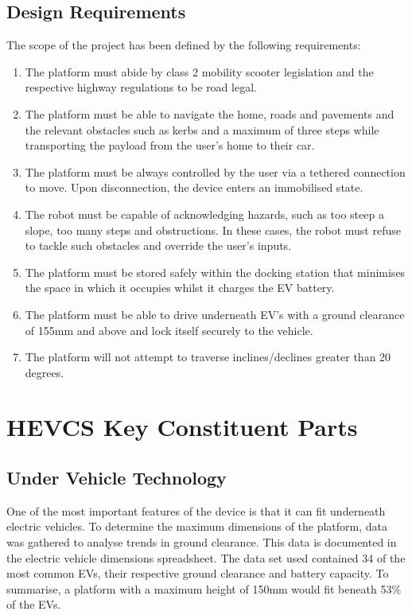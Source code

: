 \documentclass [12pt]{article}
\begin{document}
\subsection{Design Requirements}\label{sec:design_requirements}

The scope of the project has been defined by the following requirements:
\begin{enumerate}
    \item The platform must abide by class 2 mobility scooter legislation and the respective highway regulations to be road legal.
    \item The platform must be able to navigate the home, roads and pavements and the relevant obstacles such as kerbs and a maximum of three steps while transporting the payload from the user's home to their car.
    \item The platform must be always controlled by the user via a tethered connection to move. Upon disconnection, the device enters an immobilised state.
    \item The robot must be capable of acknowledging hazards, such as too steep a slope, too many steps and obstructions. In these cases, the robot must refuse to tackle such obstacles and override the user's inputs.
    \item The platform must be stored safely within the docking station that minimises the space in which it occupies whilst it charges the EV battery.
    \item The platform must be able to drive underneath EV's with a ground clearance of 155mm and above and lock itself securely to the vehicle.
    \item The platform will not attempt to traverse inclines/declines greater than 20 degrees.
  \end{enumerate}


\section{HEVCS Key Constituent Parts}\label{sec:constituent_parts}

\subsection{Under Vehicle Technology}

One of the most important features of the device is that it can fit underneath electric vehicles. To determine the maximum dimensions of the platform, data was gathered to analyse trends in ground clearance. This data is documented in the electric vehicle dimensions spreadsheet. The data set used contained 34 of the most common EVs, their respective ground clearance and battery capacity. To summarise, a platform with a maximum height of 150mm would fit beneath 53\% of the EVs.
\end{document}
